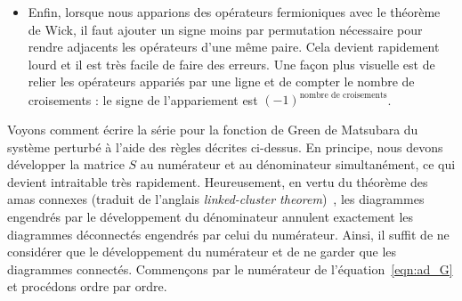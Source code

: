 \begin{itemize}
    \begin{equation}
        \mathcal{G}^{(0)}_n(\tau) = -\left[\theta(\tau)(1-f_n)-\theta(-\tau)f_n\right]e^{-\xi_n\tau},\qquad \mathcal{G}^{(0)}_n(i\omega_j)=\frac{1}{i\omega_j-\xi_n},
        \label{eqn:G0}
    \end{equation}
    où $\theta$ est la fonction de Heaviside et où les fréquences de Matsubara fermioniques $\omega_j$ sont définies à l'équation~\eqref{eqn_G_tau}.
    \item Enfin, lorsque nous apparions des opérateurs fermioniques avec le théorème de Wick, il faut ajouter un signe moins par permutation nécessaire pour rendre adjacents les opérateurs d'une même paire. Cela devient rapidement lourd et il est très facile de faire des erreurs. Une façon plus visuelle est de relier les opérateurs appariés par une ligne et de compter le nombre de croisements : le signe de l'appariement est $(-1)^{\text{nombre de croisements}}$.
\end{itemize}

Voyons comment écrire la série pour la fonction de Green de Matsubara du système perturbé à l'aide des règles décrites ci-dessus. En principe, nous devons développer la matrice $S$ au numérateur et au dénominateur simultanément, ce qui devient intraitable très rapidement. Heureusement, en vertu du théorème des amas connexes (traduit de l'anglais \textit{linked-cluster theorem})~\cite{goldstoneDerivationBruecknerManyBody1957,blochDeterminationLetatFondamental1958}, les diagrammes engendrés par le développement du dénominateur annulent exactement les diagrammes déconnectés engendrés par celui du numérateur. Ainsi, il suffit de ne considérer que le développement du numérateur et de ne garder que les diagrammes connectés. Commençons par le numérateur de l'équation~\eqref{eqn:ad_G} et procédons ordre par ordre.

